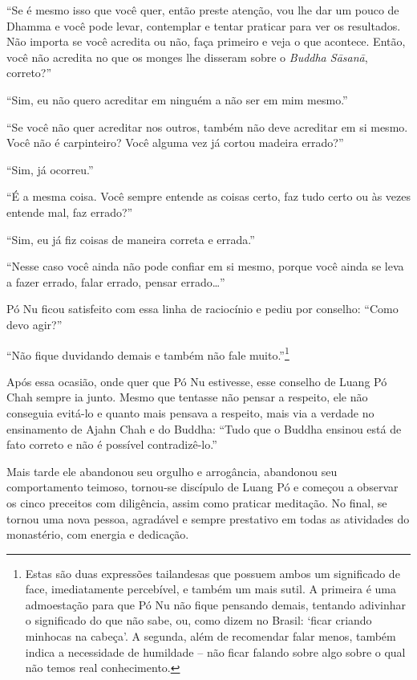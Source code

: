 ``Se é mesmo isso que você quer, então preste atenção, vou lhe dar um
pouco de Dhamma e você pode levar, contemplar e tentar praticar para ver
os resultados. Não importa se você acredita ou não, faça primeiro e veja
o que acontece. Então, você não acredita no que os monges lhe disseram
sobre o \emph{Buddha Sāsanā}, correto?''

``Sim, eu não quero acreditar em ninguém a não ser em mim mesmo.''

``Se você não quer acreditar nos outros, também não deve acreditar em si
mesmo. Você não é carpinteiro? Você alguma vez já cortou madeira
errado?''

``Sim, já ocorreu.''

``É a mesma coisa. Você sempre entende as coisas certo, faz tudo certo
ou às vezes entende mal, faz errado?''

``Sim, eu já fiz coisas de maneira correta e errada.''

``Nesse caso você ainda não pode confiar em si mesmo, porque você ainda
se leva a fazer errado, falar errado, pensar errado\ldots{}''

Pó Nu ficou satisfeito com essa linha de raciocínio e pediu por
conselho: ``Como devo agir?''

``Não fique duvidando demais e também não fale muito.''\footnote{Estas são duas
  expressões tailandesas que possuem ambos um significado de face, imediatamente
  percebível, e também um mais sutil. A primeira é uma admoestação para que Pó
  Nu não fique pensando demais, tentando adivinhar o significado do que não
  sabe, ou, como dizem no Brasil: `ficar criando minhocas na cabeça'. A segunda,
  além de recomendar falar menos, também indica a necessidade de humildade --
  não ficar falando sobre algo sobre o qual não temos real conhecimento.}

Após essa ocasião, onde quer que Pó Nu estivesse, esse conselho de Luang
Pó Chah sempre ia junto. Mesmo que tentasse não pensar a respeito, ele
não conseguia evitá-lo e quanto mais pensava a respeito, mais via a
verdade no ensinamento de Ajahn Chah e do Buddha: ``Tudo que o Buddha
ensinou está de fato correto e não é possível contradizê-lo.''

Mais tarde ele abandonou seu orgulho e arrogância, abandonou seu
comportamento teimoso, tornou-se discípulo de Luang Pó e começou a
observar os cinco preceitos com diligência, assim como praticar
meditação. No final, se tornou uma nova pessoa, agradável e sempre
prestativo em todas as atividades do monastério, com energia e
dedicação.

